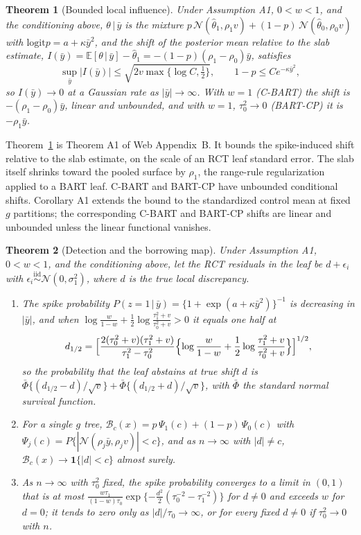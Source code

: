 \documentclass[11pt]{article}
\newcommand{\E}{\mathbb{E}}
\newcommand{\Normal}{\mathcal{N}}
\newcommand{\logit}{\mathrm{logit}}
\newcommand{\given}{\,\vert\,}
\newcommand{\iid}{\stackrel{\text{iid}}{\sim}}
\newtheorem{theorem}{Theorem}
\theoremstyle{definition}
\theoremstyle{plain}
\begin{document}
\begin{theorem}[Bounded local influence]\label{thm:influence}
Under Assumption A1, $0<w<1$, and the conditioning above, $\theta\given\bar y$ is the mixture $p\,\Normal(\hat\theta_1,\rho_1v)+(1-p)\,\Normal(\hat\theta_0,\rho_0v)$ with $\logit p=a+\kappa\bar y^2$, and the shift of the posterior mean relative to the slab estimate, $I(\bar y)=\E[\theta\given\bar y]-\hat\theta_1=-(1-p)(\rho_1-\rho_0)\bar y$, satisfies
\[
\sup_{\bar y}|I(\bar y)|\le\sqrt{2v\max\{\log C,\tfrac12\}},\qquad 1-p\le Ce^{-\kappa\bar y^2},
\]
so $I(\bar y)\to0$ at a Gaussian rate as $|\bar y|\to\infty$. With $w=1$ (C-BART) the shift is $-(\rho_1-\rho_0)\bar y$, linear and unbounded, and with $w=1$, $\tau_0^2\to0$ (BART-CP) it is $-\rho_1\bar y$.
\end{theorem}

Theorem~\ref{thm:influence} is Theorem A1 of Web Appendix~B. It bounds the spike-induced shift relative to the slab estimate, on the scale of an RCT leaf standard error. The slab itself shrinks toward the pooled surface by $\rho_1$, the range-rule regularization applied to a BART leaf. C-BART and BART-CP have unbounded conditional shifts. Corollary A1 extends the bound to the standardized control mean at fixed $g$ partitions; the corresponding C-BART and BART-CP shifts are linear and unbounded unless the linear functional vanishes.

\begin{theorem}[Detection and the borrowing map]\label{thm:map}
Under Assumption A1, $0<w<1$, and the conditioning above, let the RCT residuals in the leaf be $d+\epsilon_i$ with $\epsilon_i\iid\Normal(0,\sigma_1^2)$, where $d$ is the true local discrepancy.
\begin{enumerate}[label=(\alph*),leftmargin=2.2em]
\item The spike probability $P(z=1\given\bar y)=\{1+\exp(a+\kappa\bar y^2)\}^{-1}$ is decreasing in $|\bar y|$, and when $\log\frac{w}{1-w}+\frac{1}{2}\log\frac{\tau_1^2+v}{\tau_0^2+v}>0$ it equals one half at
\[
d_{1/2}=\Bigl[\frac{2(\tau_0^2+v)(\tau_1^2+v)}{\tau_1^2-\tau_0^2}\Bigl\{\log\frac{w}{1-w}+\frac{1}{2}\log\frac{\tau_1^2+v}{\tau_0^2+v}\Bigr\}\Bigr]^{1/2},
\]
so the probability that the leaf abstains at true shift $d$ is $\bar\Phi\{(d_{1/2}-d)/\sqrt v\}+\bar\Phi\{(d_{1/2}+d)/\sqrt v\}$, with $\bar\Phi$ the standard normal survival function.
\item For a single $g$ tree, $\mathcal B_c(x)=p\,\Psi_1(c)+(1-p)\,\Psi_0(c)$ with $\Psi_j(c)=P\{|\Normal(\rho_j\bar y,\rho_jv)|<c\}$, and as $n\to\infty$ with $|d|\ne c$, $\mathcal B_c(x)\to\mathbf 1\{|d|<c\}$ almost surely.
\item As $n\to\infty$ with $\tau_0^2$ fixed, the spike probability converges to a limit in $(0,1)$ that is at most $\frac{w\tau_1}{(1-w)\tau_0}\exp\{-\frac{d^2}{2}(\tau_0^{-2}-\tau_1^{-2})\}$ for $d\ne0$ and exceeds $w$ for $d=0$; it tends to zero only as $|d|/\tau_0\to\infty$, or for every fixed $d\ne0$ if $\tau_0^2\to0$ with $n$.
\end{enumerate}
\end{theorem}
\end{document}

